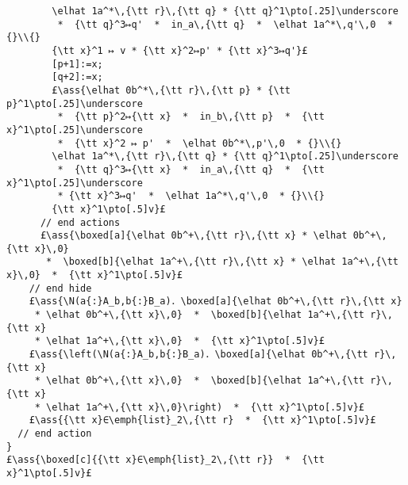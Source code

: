 \documentclass[12pt,a4paper]{article}
\makeatletter
\newcommand{\ml}[2][t]{\mbox{\mdseries\begin{tabular}[#1]{@{}L@{}}#2\end{tabular}}}
\newcommand{\ass}[1]{\ensuremath{{\color{blue}\left\{\ml[c]{#1}\right\}}}}
\renewcommand{\boxed}[2][]{{\textbf{[}}#2{\textbf{]}}_{#1}}
\makeatother
\begin{document}
\begin{lstlisting}
        \elhat 1a^*\,{\tt r}\,{\tt q} * {\tt q}^1\pto[.25]\underscore 
         *  {\tt q}^3↦q'  *  in_a\,{\tt q}  *  \elhat 1a^*\,q'\,0  * {}\\{} 
        {\tt x}^1 ↦ v * {\tt x}^2↦p' * {\tt x}^3↦q'}£
        [p+1]:=x;
        [q+2]:=x;
        £\ass{\elhat 0b^*\,{\tt r}\,{\tt p} * {\tt p}^1\pto[.25]\underscore
         *  {\tt p}^2↦{\tt x}  *  in_b\,{\tt p}  *  {\tt x}^1\pto[.25]\underscore 
         *  {\tt x}^2 ↦ p'  *  \elhat 0b^*\,p'\,0  * {}\\{}
        \elhat 1a^*\,{\tt r}\,{\tt q} * {\tt q}^1\pto[.25]\underscore 
         *  {\tt q}^3↦{\tt x}  *  in_a\,{\tt q}  *  {\tt x}^1\pto[.25]\underscore 
         * {\tt x}^3↦q'  *  \elhat 1a^*\,q'\,0  * {}\\{}
        {\tt x}^1\pto[.5]v}£
      // end actions
      £\ass{\boxed[a]{\elhat 0b^+\,{\tt r}\,{\tt x} * \elhat 0b^+\,{\tt x}\,0} 
       *  \boxed[b]{\elhat 1a^+\,{\tt r}\,{\tt x} * \elhat 1a^+\,{\tt x}\,0}  *  {\tt x}^1\pto[.5]v}£
    // end hide
    £\ass{\N(a{:}A_b,b{:}B_a)．\boxed[a]{\elhat 0b^+\,{\tt r}\,{\tt x} 
     * \elhat 0b^+\,{\tt x}\,0}  *  \boxed[b]{\elhat 1a^+\,{\tt r}\,{\tt x} 
     * \elhat 1a^+\,{\tt x}\,0}  *  {\tt x}^1\pto[.5]v}£
    £\ass{\left(\N(a{:}A_b,b{:}B_a)．\boxed[a]{\elhat 0b^+\,{\tt r}\,{\tt x}
     * \elhat 0b^+\,{\tt x}\,0}  *  \boxed[b]{\elhat 1a^+\,{\tt r}\,{\tt x}
     * \elhat 1a^+\,{\tt x}\,0}\right)  *  {\tt x}^1\pto[.5]v}£
    £\ass{{\tt x}∈\emph{list}_2\,{\tt r}  *  {\tt x}^1\pto[.5]v}£
  // end action
}
£\ass{\boxed[c]{{\tt x}∈\emph{list}_2\,{\tt r}}  *  {\tt x}^1\pto[.5]v}£

\end{lstlisting}
\end{document}
